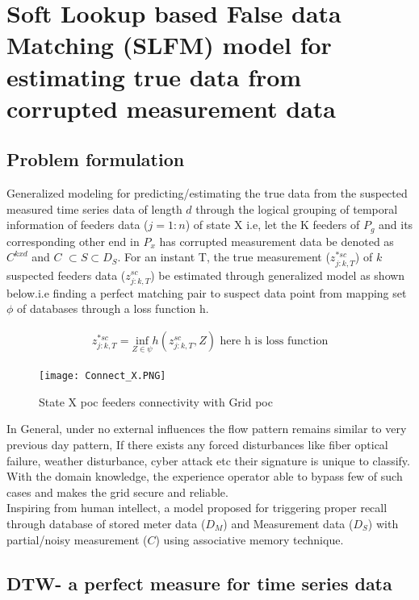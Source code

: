 \documentclass[conference]{IEEEtran}
\begin{document}
\section{Soft Lookup based False data Matching (SLFM) model for estimating true data from corrupted measurement data}

\subsection{Problem formulation }

Generalized modeling for predicting/estimating the true data from the suspected measured time series data of length $d$ through the logical grouping of temporal information of feeders data ($j=1:n$) of state X i.e, let the K feeders of  $P_g$ and its corresponding other end in $P_x$ has corrupted measurement data be denoted as  $C^{kxd}$  and $C$ $\subset S \subset D_S$. For an instant T, the true measurement ($ z^{*{sc}}_{j:k,T}$) of $k$ suspected feeders data ($ z^{{sc}}_{j:k,T}$) be estimated through generalized model as shown below.i.e finding a perfect matching pair to suspect data point from mapping set $\phi$ of databases through a loss function {h}.

\begin{align*} 
 z^{*{sc}}_{j:k,T} = \underset{Z \in \psi} {\text{inf}} h( z^{sc}_{j:k,T},Z) \tag{1} \text{ here h is loss function}
\end{align*}

\begin{figure}
\texttt{[image: Connect\_X.PNG]}
\caption{State X poc feeders connectivity with Grid poc}
\end{figure}
In General, under no external influences the flow pattern remains similar to very previous day pattern, If there exists any forced disturbances like fiber optical failure, weather disturbance, cyber attack etc  their signature is unique to classify. With the domain knowledge, the experience operator able to bypass few of such cases and makes the grid secure and reliable. \\

Inspiring from human intellect, a model proposed for triggering proper recall through database of stored meter data ($D_M$) and Measurement data ($D_S$) with partial/noisy measurement ($C$) using associative memory technique.\\

\subsection{DTW- a perfect measure for time series data}
\end{document}
